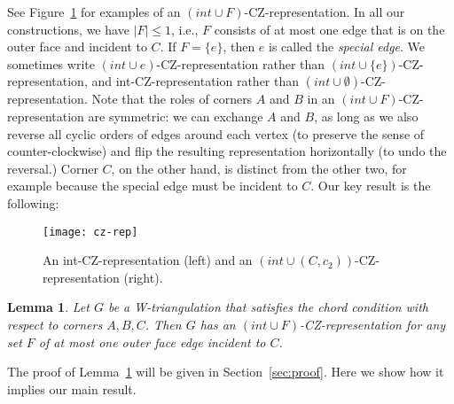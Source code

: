 \documentclass{article}
\renewcommand{\int}[1]{$(\mathit{int}\cup{#1})$}
\newtheorem{lemma}[theorem]{Lemma}
\begin{document}
See Figure~\ref{fig:partial-cz-ex} for examples of an \int{F}-CZ-representation.
In all our constructions, we have $|F|\leq 1$, i.e., $F$ consists of
at most one edge that is on the outer face and incident to $C$.
If $F=\{e\}$, then $e$ is called the \emph{special edge}.
We sometimes write \int{e}-CZ-representation rather than 
\int{\{e\}}-CZ-representation, and
int-CZ-representation rather than
\int{\emptyset}-CZ-representation.
Note that the roles of corners $A$ and $B$ in an \int{F}-CZ-representation 
are symmetric: we can exchange $A$ and $B$, as long as we also reverse
all cyclic orders of edges around each vertex (to preserve the sense
of counter-clockwise) and flip the resulting representation horizontally
(to undo the reversal.)
Corner $C$, on the other hand, is distinct from the other two, for 
example because the special edge must be incident to $C$. 
Our key result is the following:

\begin{figure}
    \centering
    \texttt{[image: cz-rep]}
    \caption{An int-CZ-representation (left) 
and an \int{(C,c_2)}-CZ-representation (right).}
    \label{fig:partial-cz-ex}
\end{figure}

\begin{lemma}
	\label{lem:representation}
    Let $G$ be a W-triangulation that 
    satisfies the chord condition with respect to corners $A,B,C$. 
	Then $G$ has an \int{F}-CZ-representation
    for any set $F$ of at most one outer face edge incident to $C$.
\end{lemma}

The proof of Lemma~\ref{lem:representation} will be given in Section~\ref{sec:proof}. Here we show how it implies our main result.
\end{document}
